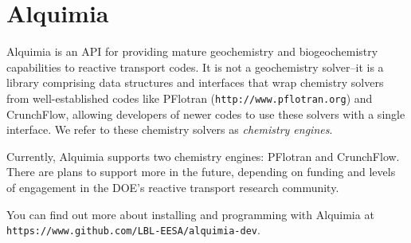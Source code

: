 \section{Alquimia}

Alquimia is an API for providing mature geochemistry and biogeochemistry 
capabilities to reactive transport codes. It is not a geochemistry solver--it is 
a library comprising data structures and interfaces that wrap chemistry solvers 
from well-established codes like PFlotran ({\tt http://www.pflotran.org}) and 
CrunchFlow, allowing developers of newer codes to use these solvers with a 
single interface. We refer to these chemistry solvers as {\em chemistry engines}.

Currently, Alquimia supports two chemistry engines: PFlotran and CrunchFlow. 
There are plans to support more in the future, depending on funding and levels 
of engagement in the DOE's reactive transport research community.

You can find out more about installing and programming with Alquimia at 
{\tt https://www.github.com/LBL-EESA/alquimia-dev}.

